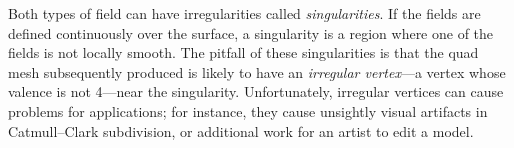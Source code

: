 Both types of field can have irregularities called \emph{singularities}. If the fields are defined continuously over the surface, a singularity is a region where one of the fields is not locally smooth.
The pitfall of these singularities is that the quad mesh subsequently produced is likely to have an \emph{irregular vertex}---a vertex whose valence is not 4---near the singularity. 
Unfortunately, irregular vertices can cause problems for applications; for instance, they cause unsightly visual artifacts in Catmull--Clark subdivision, or additional work for an artist to edit a model.


